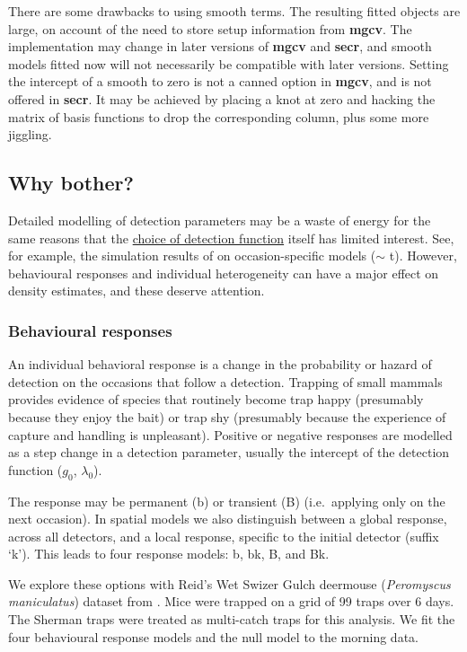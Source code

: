 \documentclass[
]{book}
\begin{document}
There are some drawbacks to using smooth terms. The resulting fitted objects are large, on account of the need to store setup information from \textbf{mgcv}. The implementation may change in later versions of \textbf{mgcv} and \textbf{secr}, and smooth models fitted now will not necessarily be compatible with later versions. Setting the intercept of a smooth to zero is not a canned option in \textbf{mgcv}, and is not offered in \textbf{secr}. It may be achieved by placing a knot at zero and hacking the matrix of basis functions to drop the corresponding column, plus some more jiggling.

\subsection{Why bother?}\label{whybother2}

Detailed modelling of detection parameters may be a waste of energy for the same reasons that the \hyperref[whybother1]{choice of detection function} itself has limited interest. See, for example, the simulation results of \citet{Sollmann2024} on occasion-specific models (\(\sim\) t). However, behavioural responses and individual heterogeneity can have a major effect on density estimates, and these deserve attention.

\subsubsection{Behavioural responses}\label{behavioural-responses}


An individual behavioral response is a change in the probability or hazard of detection on the occasions that follow a detection. Trapping of small mammals provides evidence of species that routinely become trap happy (presumably because they enjoy the bait) or trap shy (presumably because the experience of capture and handling is unpleasant). Positive or negative responses are modelled as a step change in a detection parameter, usually the intercept of the detection function (\(g_0\), \(\lambda_0\)).

The response may be permanent (b) or transient (B) (i.e.~applying only on the next occasion). In spatial models we also distinguish between a global response, across all detectors, and a local response, specific to the initial detector (suffix `k'). This leads to four response models: b, bk, B, and Bk.

We explore these options with Reid's Wet Swizer Gulch deermouse (\emph{Peromyscus maniculatus}) dataset from \citet{obwa78}. Mice were trapped on a grid of 99 traps over 6 days. The Sherman traps were treated as multi-catch traps for this analysis. We fit the four behavioural response models and the null model to the morning data.
\end{document}
